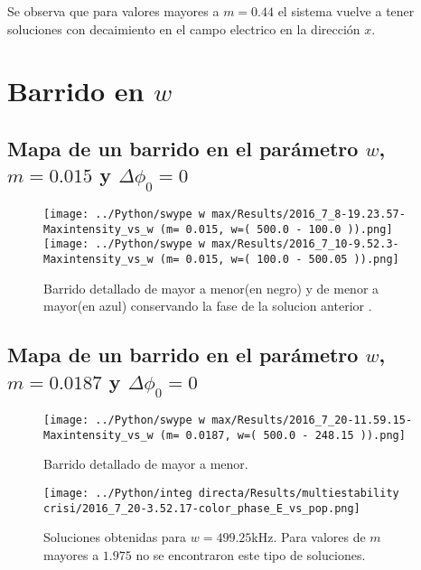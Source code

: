 		Se observa que para valores mayores a $m=0.44$ el sistema vuelve a tener soluciones con decaimiento en el campo electrico en la dirección $x$.		
				
				
	\section{Barrido en $w$}
	
	
	
	
	\subsection{Mapa de un barrido en el parámetro $w$, $m=0.015$ y $\Delta \phi_0=0$}			 		
	
	\begin{figure}[htp]
		\begin{center}
			\texttt{[image: ../Python/swype w max/Results/2016\_7\_8-19.23.57-Maxintensity\_vs\_w (m= 0.015, w=( 500.0 - 100.0 )).png]}
			\texttt{[image: ../Python/swype w max/Results/2016\_7\_10-9.52.3-Maxintensity\_vs\_w (m= 0.015, w=( 100.0 - 500.05 )).png]}	
		\end{center}
		\caption{Barrido detallado de mayor a menor(en negro) y de menor a mayor(en azul) conservando la fase de la solucion anterior .}
	\end{figure}	
	
	
		\subsection{Mapa de un barrido en el parámetro $w$, $m=0.0187$ y $\Delta \phi_0=0$}			 
		
			\begin{figure}[H]
				\begin{center}
					\texttt{[image: ../Python/swype w max/Results/2016\_7\_20-11.59.15-Maxintensity\_vs\_w (m= 0.0187, w=( 500.0 - 248.15 )).png]}
				\end{center}
				\caption{Barrido detallado de mayor a menor.}
			\end{figure}	
			
			
			\begin{figure}[htp]
				\begin{center}
					\texttt{[image: ../Python/integ directa/Results/multiestability crisi/2016\_7\_20-3.52.17-color\_phase\_E\_vs\_pop.png]}
				\end{center}
				\caption{Soluciones obtenidas para $w=499.25$kHz. Para valores de $m$ mayores a $1.975$ no se encontraron este tipo de soluciones.}
			\end{figure}		
		
